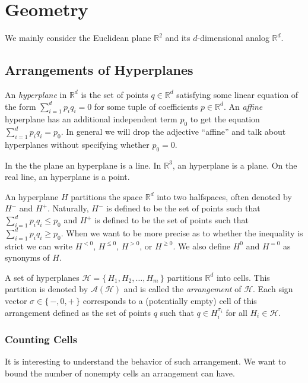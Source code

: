 \chapter{Geometry}

We mainly consider the Euclidean plane \(\mathbb{R}^2\) and its
\(d\)-dimensional analog \(\mathbb{R}^d\).

\section{Arrangements of Hyperplanes}

An \emph{hyperplane} in \(\mathbb{R}^d\) is the set of points \(q \in \mathbb{R}^d\)
satisfying some linear equation of the form \(\sum_{i=1}^{d} p_i q_i = 0\) for
some tuple of coefficients \(p \in \mathbb{R}^d\). An \emph{affine} hyperplane has an
additional independent term \(p_0\) to get the equation \(\sum_{i=1}^{d}
p_i q_i = p_0\). In general we will drop the adjective ``affine'' and talk about
hyperplanes without specifying whether \(p_0 = 0\).

In the the plane an hyperplane is a line. In \(\mathbb{R}^3\), an hyperplane is
a plane. On the real line, an hyperplane is a point.

An hyperplane \(H\) partitions the space \(\mathbb{R}^d\) into two halfspaces,
often denoted by \(H^-\) and \(H^+\).
Naturally, \(H^-\) is defined to be the set of points such that
\(\sum_{i=1}^{d} p_i q_i \leq p_0 \) and \(H^+\) is defined to be the set of
points such that \(\sum_{i=1}^{d} p_i q_i \geq p_0 \). When we want to be more
precise as to whether the inequality is strict we can write \(H^{<0}\),
\(H^{\leq 0}\), \(H^{>0}\), or \(H^{\geq 0}\).
We also define \(H^0\) and \(H^{=0}\) as synonyms of \(H\).

A set of hyperplanes \(\mathcal{H} = \{\, H_1, H_2, \ldots, H_m\,\}\)
partitions \(\mathbb{R}^d\) into cells.
%
This partition is denoted by \(\mathcal{A}(\mathcal{H})\) and is called the
\emph{arrangement} of \(\mathcal{H}\).
%
Each sign vector \(\sigma \in \{\,
-,0,+\,\}\) corresponds to a (potentially empty) cell of this arrangement
defined as the set of points \(q\) such that \(q \in H_i^{\sigma_i}\) for all
\(H_i \in \mathcal{H}\).

\subsection{Counting Cells}
It is interesting to understand the behavior of such arrangement.
We want to bound the number of nonempty cells an arrangement can have.

